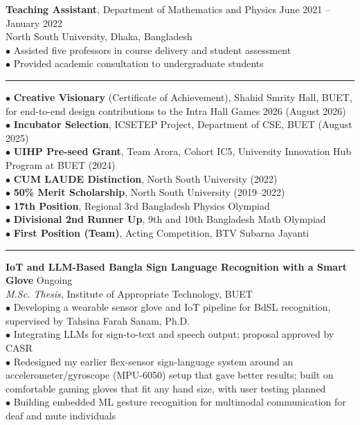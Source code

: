 \documentclass[11pt,a4paper]{article}
\renewcommand{\section}[1]{%
    \par\vspace{6pt}%
    \pagebreak[0]%
    \noindent{\large\bfseries\scshape #1}%
    \vspace{2pt}%
    \hrule%
    \vspace{6pt}%
    \nopagebreak[4]%
}
\begin{document}
\vspace{3pt}
\noindent\textbf{Teaching Assistant}, Department of Mathematics and Physics \hfill June 2021 -- January 2022\\
North South University, Dhaka, Bangladesh\\
$\bullet$ Assisted five professors in course delivery and student assessment\\
$\bullet$ Provided academic consultation to undergraduate students

\section{Achievements}

{\small\noindent $\bullet$ \textbf{Creative Visionary} (Certificate of Achievement), Shahid Smrity Hall, BUET, for end-to-end design contributions to the Intra Hall Games 2026 (August 2026)\\
$\bullet$ \textbf{Incubator Selection}, ICSETEP Project, Department of CSE, BUET (August 2025)\\
$\bullet$ \textbf{UIHP Pre-seed Grant}, Team Arora, Cohort IC5, University Innovation Hub Program at BUET (2024)\\
$\bullet$ \textbf{CUM LAUDE Distinction}, North South University (2022)\\
$\bullet$ \textbf{50\% Merit Scholarship}, North South University (2019--2022)\\
$\bullet$ \textbf{17th Position}, Regional 3rd Bangladesh Physics Olympiad\\
$\bullet$ \textbf{Divisional 2nd Runner Up}, 9th and 10th Bangladesh Math Olympiad\\
$\bullet$ \textbf{First Position (Team)}, Acting Competition, BTV Subarna Jayanti}

\section{Research Experience}

\noindent\textbf{IoT and LLM-Based Bangla Sign Language Recognition with a Smart Glove} \hfill Ongoing\\
\textit{M.Sc. Thesis}, Institute of Appropriate Technology, BUET\\
$\bullet$ Developing a wearable sensor glove and IoT pipeline for BdSL recognition, supervised by Tahsina Farah Sanam, Ph.D.\\
$\bullet$ Integrating LLMs for sign-to-text and speech output; proposal approved by CASR\\
$\bullet$ Redesigned my earlier flex-sensor sign-language system around an accelerometer/gyroscope (MPU-6050) setup that gave better results; built on comfortable gaming gloves that fit any hand size, with user testing planned\\
$\bullet$ Building embedded ML gesture recognition for multimodal communication for deaf and mute individuals
\end{document}
